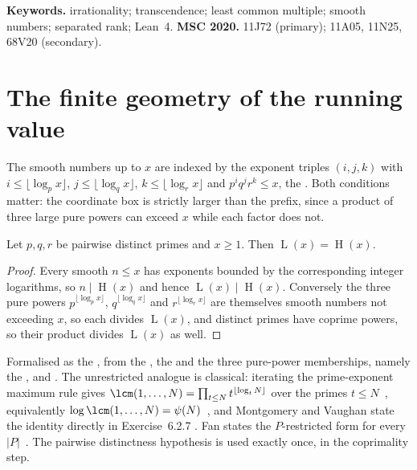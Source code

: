 \documentclass[11pt]{article}
\newcommand{\hgt}{\operatorname{H}}
\newcommand{\Lprefix}{\operatorname{L}}
\begin{document}
\medskip
\noindent\textbf{Keywords.} irrationality; transcendence; least common
multiple; smooth numbers; separated rank; Lean~4.
\qquad
\textbf{MSC 2020.} 11J72 (primary); 11A05, 11N25, 68V20 (secondary).

\section{The finite geometry of the running value}\label{long269:sec:lcm}

The smooth numbers up to $x$ are indexed by the exponent triples $(i,j,k)$ with
$i\le\lfloor\log_p x\rfloor$, $j\le\lfloor\log_q x\rfloor$,
$k\le\lfloor\log_r x\rfloor$ and $p^{i}q^{j}r^{k}\le x$, the
.  Both conditions matter: the coordinate box is strictly
larger than the prefix, since a product of three large pure powers can exceed
$x$ while each factor does not.

\begin{theorem}\label{long269:res:lcm}
Let $p,q,r$ be pairwise distinct primes and $x\ge1$.  Then
$\Lprefix(x)=\hgt(x)$.
\end{theorem}

\begin{proof}
Every smooth $n\le x$ has exponents bounded by the corresponding integer
logarithms, so $n\mid\hgt(x)$ and hence $\Lprefix(x)\mid\hgt(x)$.  Conversely
the three pure powers $p^{\lfloor\log_p x\rfloor}$,
$q^{\lfloor\log_q x\rfloor}$ and $r^{\lfloor\log_r x\rfloor}$ are themselves
smooth numbers not exceeding $x$, so each divides $\Lprefix(x)$, and distinct
primes have coprime powers, so their product divides $\Lprefix(x)$ as well.
\end{proof}

\noindent Formalised as the
, from the
, the
 and the three pure-power memberships, namely the
,
and
.
The unrestricted analogue is classical: iterating the prime-exponent maximum
rule gives $\lcm(1,\ldots,N)=\prod_{t\le N}t^{\lfloor\log_t N\rfloor}$ over the
primes $t\le N$~\cite[Ex.~1.21(a), p.~22]{apostol1976}, equivalently
$\log\lcm(1,\ldots,N)=\psi(N)$~\cite[\S4.2, p.~75]{apostol1976}, and
Montgomery and Vaughan state the identity directly in Exercise~6.2.7
\cite[p.~183]{montgomeryvaughan2007}.  Fan states the $P$-restricted form for
every $|P|$~\cite{fan2026comment}.  The pairwise distinctness hypothesis is
used exactly once, in the coprimality step.
\end{document}
